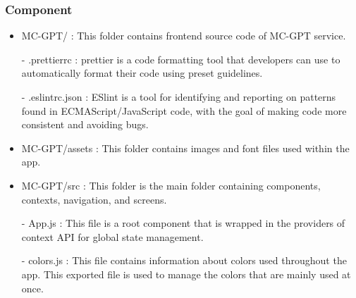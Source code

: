 \documentclass[conference]{IEEEtran}
\begin{document}
        \subsubsection{Component}
            \begin{itemize}
                \item MC-GPT/ : This folder contains frontend source code of MC-GPT service.
                    \item[-] .prettierrc : prettier is a code formatting tool that developers can use to automatically format their code using preset guidelines. 
                    \item[-] .eslintrc.json : ESlint is a tool for identifying and reporting on patterns found in ECMAScript/JavaScript code, with the goal of making code more consistent and avoiding bugs.
                \vspace{3mm}
                
                \item MC-GPT/assets : This folder contains images and font files used within the app.
                \vspace{3mm}
                
                \item MC-GPT/src : This folder is the main folder containing components, contexts, navigation, and screens.
                    \item[-] App.js : This file is a root component that is wrapped in the providers of context API for global state management.
                    \item[-] colors.js : This file contains information about colors used throughout the app. This exported file is used to manage the colors that are mainly used at once. 
                \vspace{3mm}
                

\end{itemize}
\end{document}
